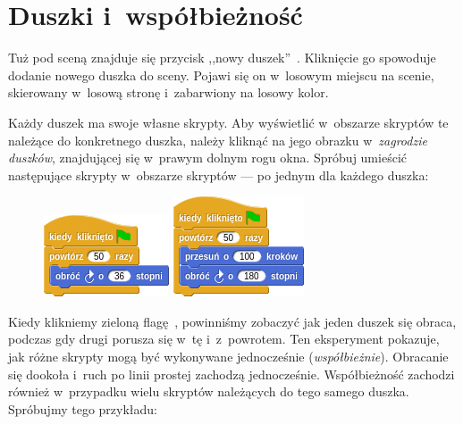 \documentclass[a4paper]{report}
\begin{document}

\section{Duszki i~współbieżność}

Tuż pod sceną znajduje się przycisk ,,nowy duszek''~. Kliknięcie go spowoduje dodanie nowego duszka do sceny. Pojawi się on w~losowym miejscu na scenie, skierowany w~losową stronę i~zabarwiony na losowy kolor.

Każdy duszek ma swoje własne skrypty. Aby wyświetlić w~obszarze skryptów te należące do konkretnego duszka, należy kliknąć na jego obrazku w~\emph{zagrodzie duszków}, znajdującej się w~prawym dolnym rogu okna. Spróbuj umieścić następujące skrypty w~obszarze skryptów --- po jednym dla każdego duszka:\nopagebreak

\begin{figure}[H]
\begin{minipage}{0.5\textwidth}
\centering
\includegraphics[scale=\defaultGraphicsScale]{duszki-i-wspolbieznosc-1}
\end{minipage}%
\begin{minipage}{0.5\textwidth}
\centering
\includegraphics[scale=\defaultGraphicsScale]{duszki-i-wspolbieznosc-2}
\end{minipage}
\end{figure}

Kiedy klikniemy zieloną flagę~, powinniśmy zobaczyć jak jeden duszek się obraca, podczas gdy drugi porusza się w~tę i~z~powrotem. Ten eksperyment pokazuje, jak różne skrypty mogą być wykonywane jednocześnie (\emph{współbieżnie}). Obracanie się dookoła i~ruch po linii prostej zachodzą jednocześnie. Współbieżność zachodzi również w~przypadku wielu skryptów należących do tego samego duszka. Spróbujmy tego przykładu:\nopagebreak
\end{document}
